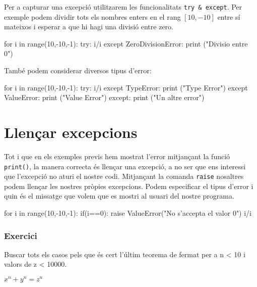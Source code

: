 Per a capturar una excepció utilitzarem les funcionalitats {\tt try \& except}. Per exemple podem dividir tots els nombres enters en el rang $[10,-10]$ entre sí mateixos i esperar a que hi hagi una divisió entre zero. 

\begin{tip}[caption=Divisió entre zero]
for i in range(10,-10,-1):
     try:
         i/i
     except ZeroDivisionError:
         print ("Divisio entre 0")
\end{tip}


També podem considerar diversos tipus d'error:

\begin{tip}[caption=Diversos errors]
for i in range(10,-10,-1):
     try:
         i/i
     except TypeError:
         print ("Type Error")
     except ValueError:
         print ("Value Error")
     except:
         print ("Un altre error")
\end{tip}




\section{Llençar excepcions}

Tot i que en els exemples previs hem mostrat l'error mitjançant la funció {\tt print()}, la manera correcta és llençar una excepció, a no ser que ens interessi que l'excepció no aturi el nostre codi. Mitjançant la comanda {\tt raise} nosaltres podem llençar les nostres pròpies excepcions. Podem especificar el tipus d'error i quin és el missatge que volem que es mostri al usuari del nostre programa.


\begin{tip}[caption=Llençar errors amb raise]
for i in range(10,-10,-1):
     if(i==0):
     	raise ValueError("No s'accepta el valor 0")
     i/i
\end{tip}


\subsubsection*{Exercici } 

Buscar tots els casos pels que és cert l'últim teorema de fermat per a n < 10 i valors de z < 10000.

$x^n + y^n = z^n$